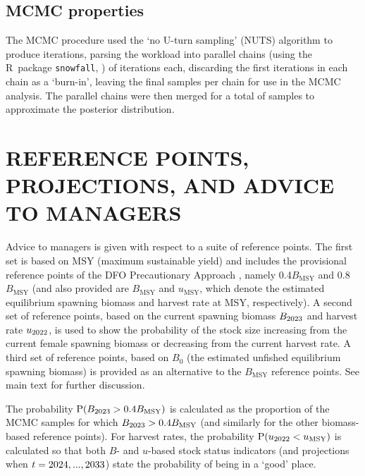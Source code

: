 \documentclass[11pt]{book}
\newcommand{\Bmsy}{B_\text{MSY}}
\newcommand{\umsy}{u_\text{MSY}}
\newcommand{\code}[1]{\normalsize\texttt{#1}\normalsize}%
\begin{document}
\subsection{MCMC properties}

The MCMC procedure used the `no U-turn sampling' (NUTS) algorithm \citep{Monnahan-Kristensen:2018, Monnahan-etal:2019} to produce \nSims{} iterations, parsing the workload into \nChains{} parallel chains (using the R~package \code{snowfall}, \citealt{R:2015_snowfall}) of \cSims{} iterations each, discarding the first \cBurn{} iterations in each chain as a `burn-in', leaving the final \cSamps{} samples per chain for use in the MCMC analysis.
The parallel chains were then merged for a total of \Nmcmc{} samples to approximate the posterior distribution.

\section{REFERENCE POINTS, PROJECTIONS, AND ADVICE TO MANAGERS}

Advice to managers is given with respect to a suite of reference points.
The first set is based on MSY (maximum sustainable yield) and includes the provisional reference points of the DFO Precautionary Approach \citep{DFO-SAR:2006_pa}, namely 0.4$\Bmsy$ and 0.8$\Bmsy$ (and also provided are $\Bmsy$ and $\umsy$, which denote the estimated equilibrium spawning biomass and harvest rate at MSY, respectively). 
A second set of reference points, based on the current spawning biomass $B_{2023}$ and harvest rate $u_{2022}$, is used to show the probability of the stock size increasing from the current female spawning biomass or decreasing from the current harvest rate.
A third set of reference points, based on $B_0$ (the estimated unfished equilibrium spawning biomass) is provided as an alternative to the $\Bmsy$ reference points.
See main text for further discussion.

The probability $\text{P}(B_{\finalYr} > 0.4\Bmsy)$ is calculated as the proportion of the \Nbase{} MCMC samples for which $B_{\finalYr} > 0.4\Bmsy$ (and similarly for the other biomass-based reference points).
For harvest rates, the probability $\text{P}(u_{\prevYear} < \umsy)$ is calculated so that both $B$- and $u$-based stock status indicators (and projections when $t=2024,...,2033$) state the probability of being in a `good' place.
\end{document}
